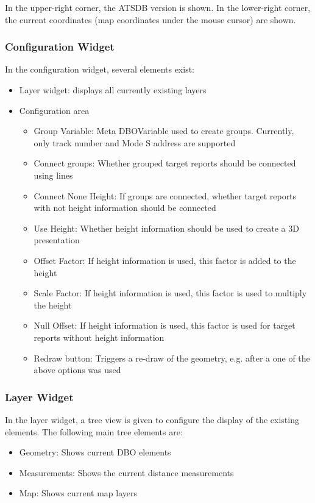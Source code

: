 In the upper-right corner, the ATSDB version is shown. In the lower-right corner, the current coordinates (map coordinates under the mouse cursor) are shown.

\subsubsection{Configuration Widget}
\label{sec:osgview_config}

In the configuration widget, several elements exist:

\begin{itemize}
 \item Layer widget: displays all currently existing layers
 \item Configuration area
\begin{itemize}
 \item Group Variable: Meta DBOVariable used to create groups. Currently, only track number and Mode S address are supported
 \item Connect groups: Whether grouped target reports should be connected using lines
 \item Connect None Height: If groups are connected, whether target reports with not height information should be connected
 \item Use Height: Whether height information should be used to create a 3D presentation
 \item Offset Factor: If height information is used, this factor is added to the height
 \item Scale Factor: If height information is used, this factor is used to multiply the height
 \item Null Offset: If height information is used, this factor is used for target reports without height information
 \item Redraw button: Triggers a re-draw of the geometry, e.g. after a one of the above options was used
\end{itemize}
\end{itemize}

\subsubsection{Layer Widget}

In the layer widget, a tree view is given to configure the display of the existing elements. The following main tree elements are:
\begin{itemize}
 \item Geometry: Shows current DBO elements
 \item Measurements: Shows the current distance measurements
 \item Map: Shows current map layers
\end{itemize}

